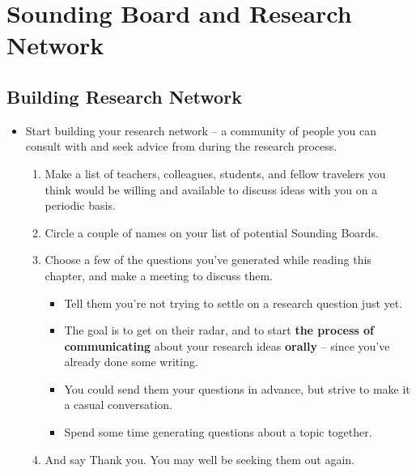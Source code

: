 \documentclass[11pt]{article}
\begin{document}
\section{Sounding Board and Research Network}
\subsection{Building Research Network}
\begin{itemize}
\item  \begin{exercise}

Start building your research network -- a community of people you can consult with and seek advice from during the research process. 
\begin{enumerate}
\item Make a list of teachers, colleagues, students, and fellow travelers you think would be willing and available to discuss ideas with you on a periodic basis. 

\item Circle a couple of names on your list of potential Sounding Boards.

\item Choose a few of the questions you’ve generated while reading this chapter, and make a meeting to discuss them. 
\begin{itemize}
\item  Tell them you’re not trying to settle on a research question just yet. 
 
\item  The goal is to get on their radar, and to start \textbf{the process of communicating} about your research ideas \textbf{orally} -- since you’ve already done some writing.

\item  You could send them your questions in advance, but strive to make it a casual conversation.

\item Spend some time generating questions about a topic together.
\end{itemize}

\item And say Thank you. You may well be seeking them out again.
\end{enumerate}
\end{exercise}
\end{itemize}
\end{document}
